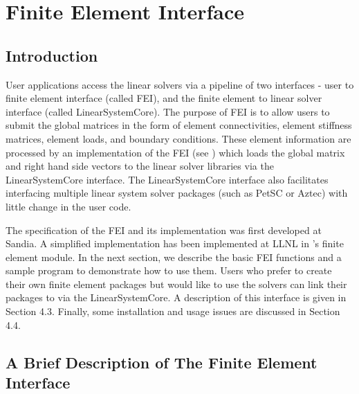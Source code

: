\chapter{Finite Element Interface}
\label{ch-FEI}

\section{Introduction}

User applications access the \hypre{} linear solvers via a pipeline of
two interfaces - user to finite element interface (called {\sf FEI}),
and the finite element to linear solver interface (called 
{\sf LinearSystemCore}). The purpose of {\sf FEI} is to allow users 
to submit the global matrices in the form of element connectivities, 
element stiffness matrices, element loads, and boundary conditions. 
These element information are processed by an implementation of the 
{\sf FEI} (see \cite{FEI-ref}) which loads the global matrix and right
hand side vectors to the linear solver libraries via the 
{\sf LinearSystemCore} interface.
The {\sf LinearSystemCore} interface also facilitates interfacing 
multiple linear system solver packages (such as PetSC or Aztec)
with little change in the user code.

The specification of the {\sf FEI} and its implementation was first
developed at Sandia. A simplified implementation has been implemented
at LLNL in \hypre{}'s finite element module. In the next section, we 
describe the basic {\sf FEI} functions and a sample program to 
demonstrate how to use them. 
Users who prefer to create their own finite
element packages but would like to use the \hypre{} solvers can link their
packages to \hypre{} via the {\sf LinearSystemCore}. A description
of this interface is given in Section 4.3.  Finally, some installation 
and usage issues are discussed in Section 4.4.

\section{A Brief Description of The Finite Element Interface}

